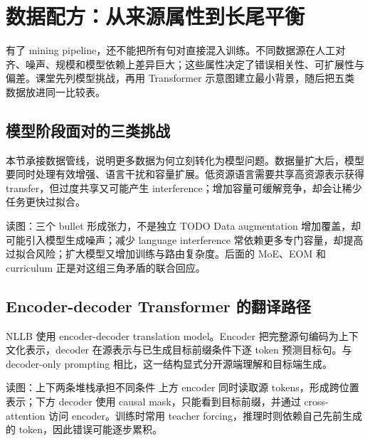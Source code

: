 \section{数据配方：从来源属性到长尾平衡}

有了 mining pipeline，还不能把所有句对直接混入训练。不同数据源在人工对齐、噪声、规模和模型依赖上差异巨大；这些属性决定了错误相关性、可扩展性与偏差。课堂先列模型挑战，再用 Transformer 示意图建立最小背景，随后把五类数据放进同一比较表。

\subsection{模型阶段面对的三类挑战}

本节承接数据管线，说明更多数据为何立刻转化为模型问题。数据量扩大后，模型要同时处理有效增强、语言干扰和容量扩展。低资源语言需要共享高资源表示获得 transfer，但过度共享又可能产生 interference；增加容量可缓解竞争，却会让稀少任务更快过拟合。


\begin{knowledgebox}{读图：三个 bullet 形成张力，不是独立 TODO}
Data augmentation 增加覆盖，却可能引入模型生成噪声；减少 language interference 常依赖更多专门容量，却提高过拟合风险；扩大模型又增加训练与路由复杂度。后面的 MoE、EOM 和 curriculum 正是对这组三角矛盾的联合回应。
\end{knowledgebox}

\subsection{Encoder-decoder Transformer 的翻译路径}

NLLB 使用 encoder-decoder translation model。Encoder 把完整源句编码为上下文化表示，decoder 在源表示与已生成目标前缀条件下逐 token 预测目标句。与 decoder-only prompting 相比，这一结构显式分开源端理解和目标端生成。


\begin{knowledgebox}{读图：上下两条堆栈承担不同条件}
上方 encoder 同时读取源 tokens，形成跨位置表示；下方 decoder 使用 causal mask，只能看到目标前缀，并通过 cross-attention 访问 encoder。训练时常用 teacher forcing，推理时则依赖自己先前生成的 token，因此错误可能逐步累积。
\end{knowledgebox}


